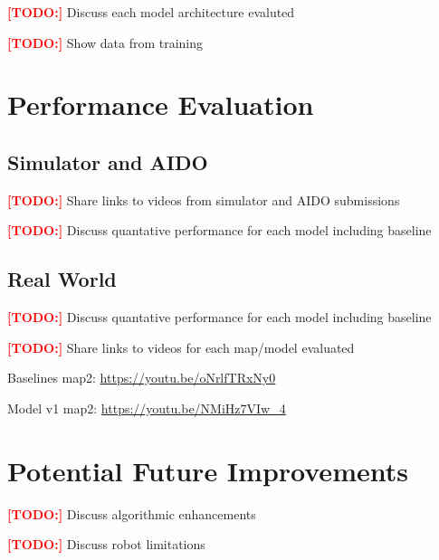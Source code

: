 \documentclass{article}
\newcommand\todo{\textcolor{red}{\textbf{[TODO:] }}}
\begin{document}
\todo Discuss each model architecture evaluted

\todo Show data from training

\section{Performance Evaluation}
\subsection{Simulator and AIDO}
\todo Share links to videos from simulator and AIDO submissions

\todo Discuss quantative performance for each model including baseline

\subsection{Real World}

\todo Discuss quantative performance for each model including baseline

\todo Share links to videos for each map/model evaluated

Baselines map2:
\url{https://youtu.be/oNrlfTRxNy0}

Model v1 map2:
\url{https://youtu.be/NMiHz7VIw_4}

\section{Potential Future Improvements}

\todo Discuss algorithmic enhancements

\todo Discuss robot limitations



\end{document}
